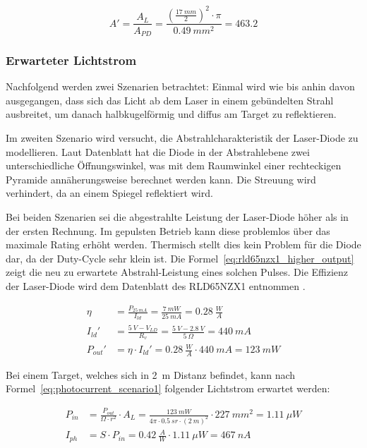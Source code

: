 \begin{equation}\label{eq:njl6401r3_lens}
    A' = \frac{A_{L}}{A_{PD}} = \frac{(\frac{17~mm}{2})^2 \cdot \pi}{0.49~mm^2} = 463.2
\end{equation}

\subsubsection{Erwarteter Lichtstrom}
Nachfolgend werden zwei Szenarien betrachtet: Einmal wird wie bis anhin davon ausgegangen, dass sich das Licht ab dem Laser
in einem gebündelten Strahl ausbreitet, um danach halbkugelförmig und diffus am Target zu reflektieren.

Im zweiten Szenario wird versucht, die Abstrahlcharakteristik der Laser-Diode zu modellieren. Laut Datenblatt hat die
Diode in der Abstrahlebene zwei unterschiedliche Öffnungswinkel, was mit dem Raumwinkel einer rechteckigen Pyramide
annäherungsweise berechnet werden kann. Die Streuung wird verhindert, da an einem Spiegel reflektiert wird.

Bei beiden Szenarien sei die abgestrahlte Leistung der Laser-Diode höher als in der ersten Rechnung. Im gepulsten
Betrieb kann diese problemlos über das maximale Rating erhöht werden. Thermisch stellt dies kein Problem für die Diode dar, da
der Duty-Cycle sehr klein ist. Die Formel~\ref{eq:rld65nzx1_higher_output} zeigt die neu zu erwartete Abstrahl-Leistung
eines solchen Pulses. Die Effizienz der Laser-Diode wird dem Datenblatt des RLD65NZX1 entnommen \cite{rohm2019rld65nzx1_datasheet}.

\begin{equation}\label{eq:rld65nzx1_higher_output}
    \begin{split}
        \eta     &= \frac{P_{25~mA}}{I_{ld}} = \frac{7~mW}{25~mA} = 0.28~\frac{W}{A}\\
        I_{ld}'  &= \frac{5~V - V_{LD}}{R_{v}} = \frac{5~V - 2.8~V}{5~\Omega} = 440~mA\\
        P_{out}' &= \eta \cdot I_{ld}' = 0.28~\frac{W}{A} \cdot 440~mA = 123~mW
    \end{split}
\end{equation}

Bei einem Target, welches sich in 2~m Distanz befindet, kann nach Formel~\ref{eq:photocurrent_scenario1} folgender
Lichtstrom erwartet werden:

\begin{equation}\label{eq:photocurrent_scenario1}
    \begin{split}
        P_{in} &= \frac{P_{out}}{\Omega \cdot r^2} \cdot A_{L} = \frac{123~mW}{4\pi \cdot 0.5~sr \cdot (2~m)^2} \cdot 227~mm^2 = 1.11~\mu W\\
        I_{ph} &= S \cdot P_{in} = 0.42~\frac{A}{W} \cdot 1.11~\mu W = 467~nA
    \end{split}
\end{equation}

